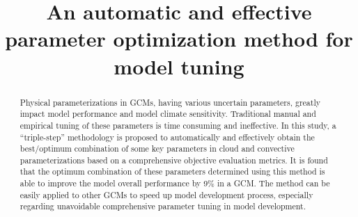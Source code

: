 \documentclass[gmd, manuscript]{copernicus}
\begin{document}
\linenumbers

\title{An automatic and effective parameter optimization method for model tuning}

















\maketitle
 

\begin{abstract}  

Physical parameterizations in GCMs, having various uncertain parameters, greatly impact model performance and model climate sensitivity.  Traditional manual and empirical tuning of these parameters is time consuming and ineffective. In this study, a ``triple-step'' methodology is proposed to automatically and effectively obtain the best/optimum  combination of some key parameters in cloud and convective parameterizations based on a comprehensive objective evaluation metrics. It is found that the optimum combination of these parameters determined using this method is able to improve the model overall performance by 9\% in a GCM. The method can be easily applied to other GCMs to speed up model development process, especially regarding unavoidable comprehensive parameter tuning in model development.

\end{abstract}


\introduction  %
\end{document}
